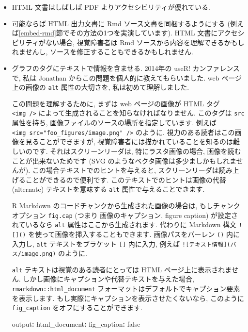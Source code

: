 \documentclass[
  11pt,
  lualatex,ja=standard,jafont=noto]{bxjsreport}
\newenvironment{Shaded}{\begin{snugshade}}{\end{snugshade}}
\newcommand{\AttributeTok}[1]{\textcolor[rgb]{0.77,0.63,0.00}{#1}}
\newcommand{\CharTok}[1]{\textcolor[rgb]{0.31,0.60,0.02}{#1}}
\newcommand{\FunctionTok}[1]{\textcolor[rgb]{0.00,0.00,0.00}{#1}}
\newcommand{\KeywordTok}[1]{\textcolor[rgb]{0.13,0.29,0.53}{\textbf{#1}}}
\begin{document}
\begin{itemize}
\item
  HTML 文書はしばしば PDF よりアクセシビリティが優れている.
\item
  可能ならば HTML 出力文書に Rmd ソース文書を同梱するようにする (例えば\ref{embed-rmd}節でその方法の1つを実演しています). HTML 文書にアクセシビリティがない場合, 視覚障害者は Rmd ソースから内容を理解できるかもしれませんし, ソースを修正することもできるかもしれません.
\item
  グラフのタグにテキストで情報を含ませる. 2014年の useR! カンファレンスで, 私は Jonathan からこの問題を個人的に教えてもらいました. web ページ上の画像の \texttt{alt} 属性の大切さを, 私は初めて理解しました.

  この問題を理解するために, まずは web ページの画像が HTML タグ \texttt{\textless{}img\ /\textgreater{}} によって生成されることを知らなければなりません. このタグは \texttt{src} 属性を持ち, 画像ファイルのソースの場所を指定しています. 例えば \texttt{\textless{}img\ src="foo\_figures/image.png"\ /\textgreater{}} のように. 視力のある読者はこの画像を見ることができますが, 視覚障害者には描かれていることを知るのは難しいのです. それはスクリーンリーダは, 特にラスタ画像の場合, 画像を読むことが出来ないためです (SVG のようなベクタ画像は多少ましかもしれませんが). この場合テキストでのヒントを与えると, スクリーンリーダは読み上げることができるので便利です. このテキストでのヒントは画像の代替 (alternate) テキストを意味する \texttt{alt} 属性で与えることできます.

  R Markdown のコードチャンクから生成された画像の場合は, もしチャンクオプション \texttt{fig.cap} (つまり 画像のキャプション, figure caption) が設定されているなら \texttt{alt} 属性はここから生成されます. 代わりに Markdown 構文 \texttt{!{[}{]}()} を使って画像を挿入することもできます. 画像パスをパーレン \texttt{()} 内に入力し, \texttt{alt} テキストをブラケット \texttt{{[}{]}} 内に入力, 例えば \texttt{!{[}テキスト情報{]}(パス/image.png)} のように.

  \texttt{alt} テキストは視覚のある読者にとっては HTML ページ上に表示されません. しかし画像にキャプションや代替テキストを与えた場合, \texttt{rmarkdown::html\_document} フォーマットはデフォルトでキャプション要素を表示します. もし実際にキャプションを表示させたくないなら, このように \texttt{fig\_caption} をオフにすることができます.

\begin{Shaded}
\begin{Highlighting}[]
\FunctionTok{output}\KeywordTok{:}
\AttributeTok{  }\FunctionTok{html\_document}\KeywordTok{:}
\AttributeTok{    }\FunctionTok{fig\_caption}\KeywordTok{:}\AttributeTok{ }\CharTok{false}
\end{Highlighting}
\end{Shaded}


\end{itemize}
\end{document}
